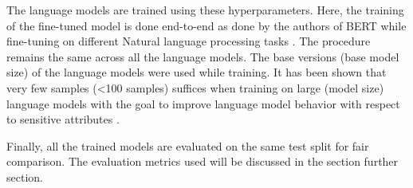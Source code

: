 \begin{table}[h!]
\caption{Hyperparameter search results for language models}
\label{tab:search_results}
\end{table}

The language models are trained using these hyperparameters. Here, the training of the fine-tuned model is done end-to-end as done by the authors of BERT while fine-tuning on different Natural language processing tasks \cite{devlin2018bert}. The procedure remains the same across all the language models. The base versions (base model size) of the language models were used while training. It has been shown that very few samples (<100 samples) suffices when training on large (model size) language models with the goal to improve language model behavior with respect to sensitive attributes \cite{solaiman2021process}. 

Finally, all the trained models are evaluated on the same test split for fair comparison. The evaluation metrics used will be discussed in the section further section.


